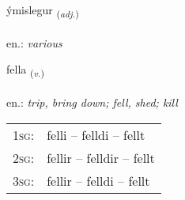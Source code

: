 \documentclass[frontgrid, backgrid]{flacards}\usepackage[]{graphicx}\usepackage[]{xcolor}
\begin{document}
\renewcommand{\flhead}{\vskip5pt \fboxsep=0pt {\small\bfseries\footnotesize Lýsingarorð | Adjective}}
\renewcommand{\fcfoot}{\vskip5pt \fboxsep=0pt \hspace{2pt}{\small\bfseries\footnotesize 2K}}

\renewcommand{\blhead}{\vskip5pt {\small\bfseries\footnotesize Lýsingarorð | Adjective }}
\renewcommand{\bcfoot}{\vskip5pt \hspace{2pt}{\small\bfseries\footnotesize 2K}}


{ýmislegur \small{\textsubscript{(\textit{adj.})}} \\[1ex] %
\textphonetic{[iːmɪstlɛɣʏr]} \\
en.: \emph{various} \\  [2ex]
\renewcommand*{\arraystretch}{0.8}
}

\renewcommand{\flhead}{\vskip5pt \fboxsep=0pt {\small\bfseries\footnotesize Sagnorð | Verb}}
\renewcommand{\fcfoot}{\vskip5pt \fboxsep=0pt \hspace{2pt}{\small\bfseries\footnotesize 2K}}

\renewcommand{\blhead}{\vskip5pt {\small\bfseries\footnotesize Sagnorð | Verb }}
\renewcommand{\bcfoot}{\vskip5pt \hspace{2pt}{\small\bfseries\footnotesize 2K}}


{fella \small{\textsubscript{(\textit{v.})}} \\[1ex] %
\textphonetic{[fɛtla]} \\
en.: \emph{trip, bring down; fell, shed; kill} \\  [2ex]
\renewcommand*{\arraystretch}{0.8}
\begin{tabular}{p{1cm}l}
\textsc{1sg}: & felli -- felldi -- fellt \\ 
\textsc{2sg}: & fellir -- felldir -- fellt \\ 
\textsc{3sg}: & fellir -- felldi -- fellt \\ 
\end{tabular}
}
\end{document}
